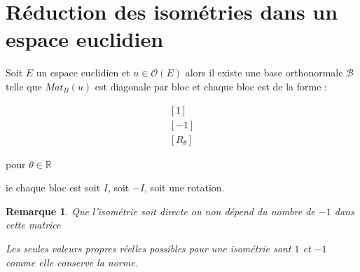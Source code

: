 \documentclass[a4paper,12pt]{book}
\newcommand{\Thr}[2]{\begin{tcolorbox}[sharp corners, colback=white,colframe=red!90!black!75, title=Théorème : #1]#2\end{tcolorbox}}
\newtheorem{Rem}{Remarque}[section]
\def\R{\mathbb{R}}
\begin{document}
\section{Réduction des isométries dans un espace euclidien}
\Thr{}{Soit $E$ un espace euclidien et $u\in\mathcal{O}(E)$ alors il existe une base orthonormale $\mathcal{B}$ telle que $Mat_B(u)$ est diagonale par bloc et chaque bloc est de la forme :
\par $$\begin{matrix} [1] \\ [-1] \\ [R_\theta]\end{matrix}$$
\par pour $\theta\in\R$
\par ie chaque bloc est soit $I$, soit $-I$, soit une rotation.}
\begin{Rem}
Que l'isométrie soit directe ou non dépend du nombre de $-1$ dans cette matrice
\par Les seules valeurs propres réelles possibles pour une isométrie sont $1$ et $-1$ comme elle conserve la norme.
\end{Rem}
\end{document}
